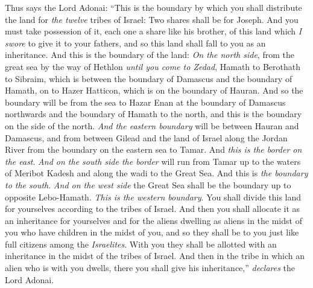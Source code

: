 \begin{biblechapter}
\verse Thus says the Lord Adonai: “This is the boundary by which you shall distribute the land for \textit{the twelve} tribes of Israel: Two shares shall be for Joseph.
\verse And you must take possession of it, each one a share like his brother, of this land which \textit{I swore} to give it to your fathers, and so this land shall fall to you as an inheritance.
\verse And this is the boundary of the land: \textit{On the north side}, from the great sea by the way of Hethlon \textit{until you come to Zedad},
\verse Hamath to Berothath to Sibraim, which is between the boundary of Damascus and the boundary of Hamath, on to Hazer Hatticon, which is on the boundary of Hauran.
\verse And so the boundary will be from the sea to Hazar Enan at the boundary of Damascus northwards and the boundary of Hamath to the north, and this is the boundary on the side of the north.
\verse \textit{And the eastern boundary} will be between Hauran and Damascus, and from between Gilead and the land of Israel along the Jordan River from the boundary on the eastern sea to Tamar. And \textit{this is the border on the east}.
\verse \textit{And on the south side the border} will run from Tamar up to the waters of Meribot Kadesh and along the wadi to the Great Sea. And this is \textit{the boundary to the south}.
\verse \textit{And on the west side} the Great Sea shall be the boundary up to opposite Lebo-Hamath. \textit{This is the western boundary}.
\verse You shall divide this land for yourselves according to the tribes of Israel.
\verse And then you shall allocate it as an inheritance for yourselves and for the aliens dwelling as aliens in the midst of you who have children in the midst of you, and so they shall be to you just like full citizens among the \textit{Israelites}. With you they shall be allotted with an inheritance in the midst of the tribes of Israel.
\verse And then in the tribe in which an alien who is with you dwells, there you shall give his inheritance,” \textit{declares} the Lord Adonai.
\end{biblechapter}

